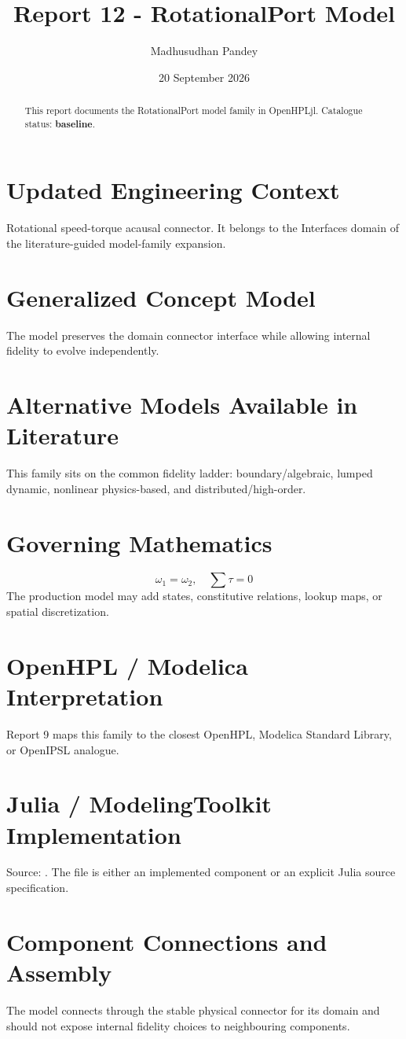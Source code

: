 \documentclass[10pt,a4paper]{article}
\title{Report 12 - RotationalPort Model}
\author{Madhusudhan Pandey}
\date{20 September 2026}
\begin{document}
\maketitle
\begin{abstract}
This report documents the RotationalPort model family in OpenHPLjl. Catalogue status: \textbf{baseline}.
\end{abstract}
\section{Updated Engineering Context}
Rotational speed-torque acausal connector. It belongs to the Interfaces domain of the literature-guided model-family expansion.
\section{Generalized Concept Model}
The model preserves the domain connector interface while allowing internal fidelity to evolve independently.
\section{Alternative Models Available in Literature}
This family sits on the common fidelity ladder: boundary/algebraic, lumped dynamic, nonlinear physics-based, and distributed/high-order.
\section{Governing Mathematics}
\[\omega_1=\omega_2,\quad \sum \tau=0\]
The production model may add states, constitutive relations, lookup maps, or spatial discretization.
\section{OpenHPL / Modelica Interpretation}
Report 9 maps this family to the closest OpenHPL, Modelica Standard Library, or OpenIPSL analogue.
\section{Julia / ModelingToolkit Implementation}
Source: \texttt{}. The file is either an implemented component or an explicit Julia source specification.
\section{Component Connections and Assembly}
The model connects through the stable physical connector for its domain and should not expose internal fidelity choices to neighbouring components.
\end{document}
